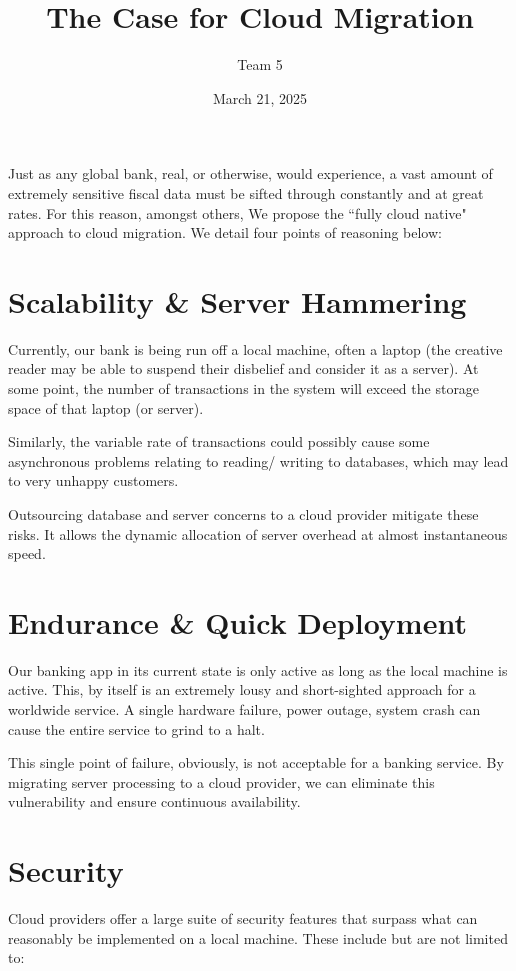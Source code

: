 \documentclass{article}
\title{The Case for Cloud Migration}
\author{Team 5}
\date{March 21, 2025}
\begin{document}
	\maketitle
	\par Just as any global bank, real, or otherwise, would experience, a vast amount of extremely sensitive fiscal data must be sifted through constantly and at great rates. For this reason, amongst others, We propose the ``fully cloud native" approach to cloud migration. We detail four points of reasoning below:
	\section{Scalability \& Server Hammering}
	\par Currently, our bank is being run off a local machine, often a laptop (the creative reader may be able to suspend their disbelief and consider it as a server). At some point, the number of transactions in the system will exceed the storage space of that laptop (or server).
	\par Similarly, the variable rate of transactions could possibly cause some asynchronous problems relating to reading/ writing to databases, which may lead to very unhappy customers.
	\par Outsourcing database and server concerns to a cloud provider mitigate these risks. It allows the dynamic allocation of server overhead at almost instantaneous speed.
	\section{Endurance \& Quick Deployment}
	\par Our banking app in its current state is only active as long as the local machine is active. This, by itself is an extremely lousy and short-sighted approach for a worldwide service. A single hardware failure, power outage, system crash can cause the entire service to grind to a halt.
	\par This single point of failure, obviously, is not acceptable for a banking service. By migrating server processing to a cloud provider, we can eliminate this vulnerability and ensure continuous availability.
	\section{Security}
	\par Cloud providers offer a large suite of security features that surpass what can reasonably be implemented on a local machine. These include but are not limited to:
\end{document}
